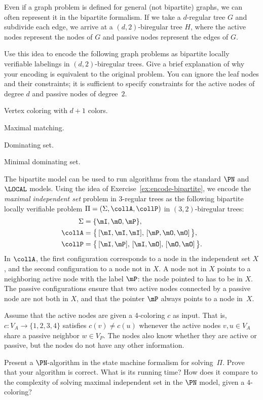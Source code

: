 \begin{ex}\label{ex:encode-bipartite}
Even if a graph problem is defined for general (not bipartite) graphs, we can often represent it in the bipartite formalism. If we take a $d$-regular tree $G$ and subdivide each edge, we arrive at a $(d,2)$-biregular tree $H$, where the active nodes represent the nodes of $G$ and passive nodes represent the edges of $G$.

Use this idea to encode the following graph problems as bipartite locally verifiable labelings in $(d,2)$-biregular trees. Give a brief explanation of why your encoding is equivalent to the original problem. You can ignore the leaf nodes and their constraints; it is sufficient to specify constraints for the active nodes of degree $d$ and passive nodes of degree~$2$.
\begin{subex}[noitemsep]
	\item Vertex coloring with $d+1$ colors.
	\item Maximal matching.
	\item Dominating set.
	\item Minimal dominating set.
\end{subex}
\end{ex}

\begin{ex}
	The bipartite model can be used to run algorithms from the standard $\PN$ and $\LOCAL$ models. Using the idea of Exercise~\ref{ex:encode-bipartite}, we encode the \emph{maximal independent set} problem in $3$-regular trees as the following bipartite locally verifiable problem $\Pi = (\Sigma, \collA, \collP)$ in $(3,2)$-biregular trees:
	\begin{align*}
		\Sigma &= \{ \mI, \mO, \mP \}, \\
		\collA &= \bigl\{ \, [\mI, \mI, \mI],\, [\mP, \mO, \mO] \, \bigr\}, \\
		\collP &= \bigl\{ \, [\mI, \mP],\, [\mI, \mO],\, [\mO, \mO] \, \bigr\}.
	\end{align*}
	In $\collA$, the first configuration corresponds to a node in the independent set $X$, and the second configuration to a node not in $X$. A node not in $X$ points to a neighboring active node with the label $\mP$: the node pointed to has to be in $X$. The passive configurations ensure that two active nodes connected by a passive node are not both in $X$, and that the pointer $\mP$ always points to a node in~$X$.
	
	Assume that the active nodes are given a 4-coloring $c$ as input. That is, $c\colon V_A \to \{1,2,3,4\}$ satisfies $c(v) \ne c(u)$ whenever the active nodes $v,u \in V_A$ share a passive neighbor $w \in V_P$. The nodes also know whether they are active or passive, but the nodes do not have any other information.
	
	Present a $\PN$-algorithm in the state machine formalism for solving~$\Pi$. Prove that your algorithm is correct. What is its running time? How does it compare to the complexity of solving maximal independent set in the $\PN$ model, given a $4$-coloring? 
\end{ex}

